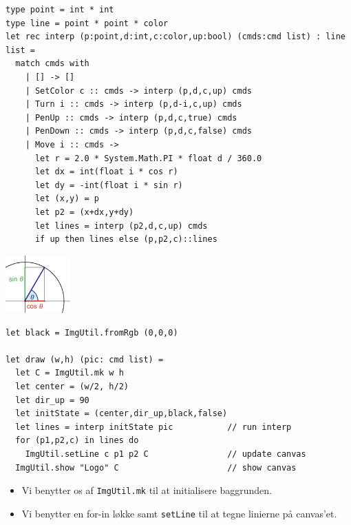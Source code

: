 \documentclass[rgb]{beamer}
\begin{document}
\begin{frame}[fragile]
\begin{footnotesize}

  \vspace{1ex}
\begin{lstlisting}[numbers=none,frame=none,mathescape]
type point = int * int
type line = point * point * color
let rec interp (p:point,d:int,c:color,up:bool) (cmds:cmd list) : line list =
  match cmds with
    | [] -> []
    | SetColor c :: cmds -> interp (p,d,c,up) cmds
    | Turn i :: cmds -> interp (p,d-i,c,up) cmds
    | PenUp :: cmds -> interp (p,d,c,true) cmds
    | PenDown :: cmds -> interp (p,d,c,false) cmds
    | Move i :: cmds ->
      let r = 2.0 * System.Math.PI * float d / 360.0
      let dx = int(float i * cos r)
      let dy = -int(float i * sin r)
      let (x,y) = p
      let p2 = (x+dx,y+dy)
      let lines = interp (p2,d,c,up) cmds
      if up then lines else (p,p2,c)::lines
\end{lstlisting}

\vspace{-25mm}\hspace{90mm}\includegraphics[width=25mm]{../images/cossin.png}

\end{footnotesize}
\end{frame}

\begin{frame}[fragile]
\begin{footnotesize}

  \vspace{1ex}

\begin{lstlisting}[numbers=none,frame=none,mathescape]
let black = ImgUtil.fromRgb (0,0,0)

let draw (w,h) (pic: cmd list) =
  let C = ImgUtil.mk w h
  let center = (w/2, h/2)
  let dir_up = 90
  let initState = (center,dir_up,black,false)
  let lines = interp initState pic           // run interp
  for (p1,p2,c) in lines do
    ImgUtil.setLine c p1 p2 C                // update canvas
  ImgUtil.show "Logo" C                      // show canvas
\end{lstlisting}

  \begin{itemize}
  \item Vi benytter os af \lstinline{ImgUtil.mk} til at initialisere baggrunden.
  \item Vi benytter en for-in løkke samt
    \lstinline{setLine} til at tegne linierne på canvas'et.
  \end{itemize}

\end{footnotesize}
\end{frame}
\end{document}
